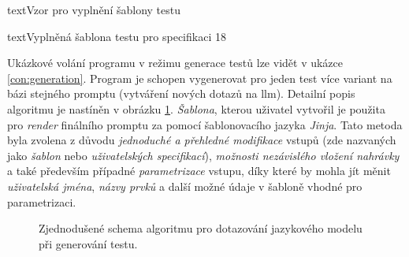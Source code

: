 \documentclass[czech, ma, kiv, he, iso690numb, pdf, viewonly]{fasthesis}
\begin{document}
\begin{code}{text}{Vzor pro vyplnění šablony testu \label{lst:template}}
{\begin{code}{text}{Vyplněná šablona testu pro specifikaci 18 \label{lst:spec18}}
{        Ukázkové volání programu v režimu generace testů lze vidět v ukázce \ref{con:generation}. Program je schopen vygenerovat pro jeden test více variant na bázi stejného promptu (vytváření nových dotazů na \Gls{llm}). Detailní popis algoritmu je nastíněn v obrázku \ref{fig:llm_query_algo}. \textit{Šablona}, kterou uživatel vytvořil je použita pro \emph{render} finálního promptu za pomocí šablonovacího jazyka \textit{Jinja}. Tato metoda byla zvolena z důvodu \textit{jednoduché a přehledné modifikace} vstupů (zde nazvaných jako \textit{šablon} nebo \textit{uživatelských specifikací}), \textit{možnosti nezávislého vložení nahrávky} a také především případné \textit{parametrizace} vstupu, díky které by mohla jít měnit \textit{uživatelská jména}, \textit{názvy prvků} a další možné údaje v šabloně vhodné pro parametrizaci. 

        \begin{figure}
            \centering
            \caption{Zjednodušené schema algoritmu pro dotazování jazykového modelu při generování testu.}
            \label{fig:llm_query_algo}
        \end{figure}

}
\end{code}}
\end{code}
\end{document}

